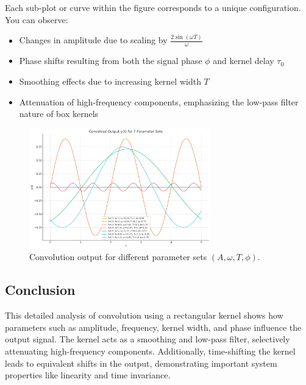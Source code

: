 Each sub-plot or curve within the figure corresponds to a unique configuration. You can observe:
\begin{itemize}
    \item Changes in amplitude due to scaling by \( \frac{2\sin(\omega T)}{\omega} \)
    \item Phase shifts resulting from both the signal phase \( \phi \) and kernel delay \( \tau_0 \)
    \item Smoothing effects due to increasing kernel width \( T \)
    \item Attenuation of high-frequency components, emphasizing the low-pass filter nature of box kernels
\end{itemize}

\begin{figure}[h]
    \centering
    \includegraphics[width=0.7\textwidth]{codes/codes_sin_2/figs/all_varies.png}
    \caption{Convolution output for different parameter sets \( (A, \omega, T, \phi) \).}
\end{figure}


\subsection{Conclusion}

This detailed analysis of convolution using a rectangular kernel shows how parameters such as amplitude, frequency, kernel width, and phase influence the output signal. The kernel acts as a smoothing and low-pass filter, selectively attenuating high-frequency components. Additionally, time-shifting the kernel leads to equivalent shifts in the output, demonstrating important system properties like linearity and time invariance.
